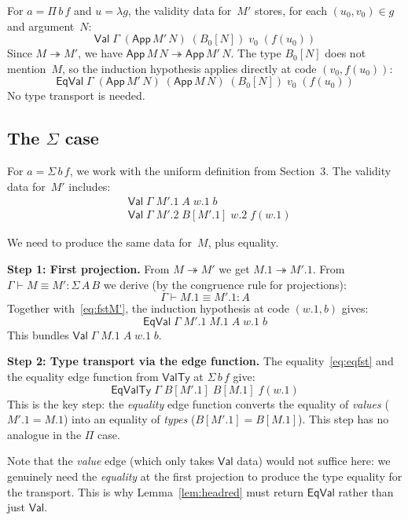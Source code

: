 \documentclass[11pt]{article}
\newcommand{\Val}{\mathsf{Val}}
\newcommand{\EqVal}{\mathsf{EqVal}}
\newcommand{\ValTy}{\mathsf{ValTy}}
\newcommand{\EqValTy}{\mathsf{EqValTy}}
\newcommand{\HasType}{\vdash}
\newcommand{\ConvTm}{\equiv}
\newcommand{\HeadRed}{\twoheadrightarrow}
\newcommand{\App}{\mathsf{App}}
\newcommand{\pj}[2]{#1\mbox{.}#2}
\begin{document}
For $a = \Pi\,b\,f$ and $u = \lambda g$, the validity data for~$M'$
stores, for each $(u_0, v_0) \in g$ and argument~$N$:
\[
  \Val\;\Gamma\;(\App\,M'\,N)\;(B_0[N])\;v_0\;(f(u_0))
\]
Since $M \HeadRed M'$, we have $\App\,M\,N \HeadRed \App\,M'\,N$.
The type $B_0[N]$ does not mention~$M$, so the induction hypothesis
applies directly at code $(v_0, f(u_0))$:
\[
  \EqVal\;\Gamma\;(\App\,M'\,N)\;(\App\,M\,N)\;(B_0[N])\;v_0\;(f(u_0))
\]
No type transport is needed.

\subsection{The $\Sigma$ case}\label{sec:sigma}

For $a = \Sigma\,b\,f$, we work with the uniform definition from
Section~3.  The validity data for~$M'$ includes:
\begin{align}
  &\Val\;\Gamma\;\pj{M'}{1}\;A\;\pj{w}{1}\;b  \label{eq:fstM'}\\
  &\Val\;\Gamma\;\pj{M'}{2}\;B[\pj{M'}{1}]\;\pj{w}{2}\;f(\pj{w}{1})  \label{eq:sndM'}
\end{align}

We need to produce the same data for~$M$, plus equality.

\medskip
\noindent\textbf{Step 1: First projection.}
From $M \HeadRed M'$ we get $\pj{M}{1} \HeadRed \pj{M'}{1}$.  From
$\Gamma \HasType M \ConvTm M' : \Sigma\,A\,B$ we derive (by the congruence
rule for projections):
\[
  \Gamma \HasType \pj{M}{1} \ConvTm \pj{M'}{1} : A
\]
Together with~\eqref{eq:fstM'}, the induction hypothesis at code
$(\pj{w}{1}, b)$ gives:
\begin{equation}\label{eq:eqfst}
  \EqVal\;\Gamma\;\pj{M'}{1}\;\pj{M}{1}\;A\;\pj{w}{1}\;b
\end{equation}
This bundles $\Val\;\Gamma\;\pj{M}{1}\;A\;\pj{w}{1}\;b$.

\medskip
\noindent\textbf{Step 2: Type transport via the edge function.}
The equality~\eqref{eq:eqfst} and the equality edge function from $\ValTy$ at
$\Sigma\,b\,f$ give:
\begin{equation}\label{eq:eqty}
  \EqValTy\;\Gamma\;B[\pj{M'}{1}]\;B[\pj{M}{1}]\;f(\pj{w}{1})
\end{equation}
This is the key step: the \emph{equality} edge function converts the equality of
\emph{values} ($\pj{M'}{1} = \pj{M}{1}$) into an equality of \emph{types}
($B[\pj{M'}{1}] = B[\pj{M}{1}]$).  This step has no analogue in the $\Pi$ case.

Note that the \emph{value} edge (which only takes $\Val$ data) would not suffice
here: we genuinely need the \emph{equality} at the first projection to produce
the type equality for the transport.  This is why
Lemma~\ref{lem:headred} must return $\EqVal$ rather than just $\Val$.
\end{document}
